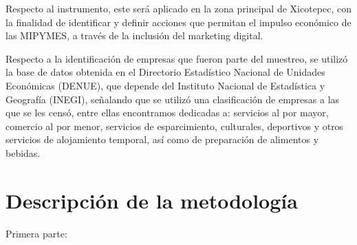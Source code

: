 \documentclass[12pt]{difu100cia} %
\begin{document}
Respecto al instrumento, este será aplicado en la zona principal de Xicotepec, con la finalidad de identificar y definir acciones que permitan el impulso económico de las MIPYMES, a través de la inclusión del marketing digital.

Respecto a la identificación de empresas que fueron parte del muestreo, se utilizó la base de datos obtenida en el Directorio Estadístico Nacional de Unidades Económicas (DENUE), que depende del Instituto Nacional de Estadística y Geografía (INEGI), señalando que se utilizó una clasificación de empresas a las que se les censó, entre ellas encontramos dedicadas a: servicios al por mayor, comercio al por menor, servicios de esparcimiento, culturales, deportivos y otros servicios de alojamiento temporal, así como de preparación de alimentos y bebidas.  
      

\section{Descripción de la metodología}
\label{Descripcion de la metodología}

Primera parte:
\end{document}
